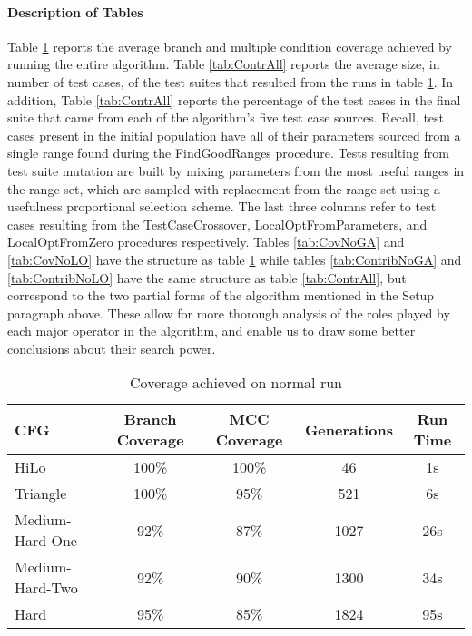 \documentclass[runningheads]{llncs}
\begin{document}
\paragraph{Description of Tables} Table \ref{tab:CovAll} reports the average branch and multiple condition coverage achieved by running the entire algorithm. Table \ref{tab:ContrAll} reports the average size, in number of test cases, of the test suites that resulted from the runs in table \ref{tab:CovAll}. In addition, Table \ref{tab:ContrAll} reports the percentage of the test cases in the final suite that came from each of the algorithm's five test case sources. Recall, test cases present in the initial population have all of their parameters sourced from a single range found during the FindGoodRanges procedure. Tests resulting from test suite mutation are built by mixing parameters from the most useful ranges in the range set, which are sampled with replacement from the range set using a usefulness proportional selection scheme. The last three columns refer to test cases resulting from the TestCaseCrossover, LocalOptFromParameters, and LocalOptFromZero procedures respectively. Tables \ref{tab:CovNoGA} and \ref{tab:CovNoLO} have the structure as table \ref{tab:CovAll} while tables \ref{tab:ContribNoGA} and \ref{tab:ContribNoLO} have the same structure as table \ref{tab:ContrAll}, but correspond to the two partial forms of the algorithm mentioned in the Setup paragraph above. These allow for more thorough analysis of the roles played by each major operator in the algorithm, and enable us to draw some better conclusions about their search power.

\begin{table}[h!]
	\begin{center}
		\begin{tabular}{| l | c | c | c | c |}
			\hline
			CFG             & Branch Coverage & MCC Coverage & Generations & Run Time \\ \hline
			HiLo            & 100\%           & 100\%        & 46          & 1s       \\ \hline
			Triangle        & 100\%           & 95\%         & 521         & 6s       \\ \hline
			Medium-Hard-One & 92\%            & 87\%         & 1027        & 26s      \\ \hline
			Medium-Hard-Two & 92\%            & 90\%         & 1300        & 34s      \\ \hline
			Hard            & 95\%            & 85\%         & 1824        & 95s      \\ \hline
		\end{tabular}
	\end{center}
	\caption{Coverage achieved on normal run}  
	\label{tab:CovAll}
\end{table}
\end{document}
